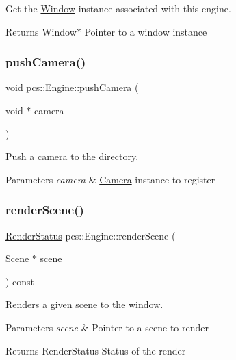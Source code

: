 Get the \hyperlink{classpcs_1_1Window}{Window} instance associated with this engine. 

\begin{DoxyReturn}{Returns}
Window$\ast$ Pointer to a window instance 
\end{DoxyReturn}
\mbox{\label{classpcs_1_1Engine_ab43d2dd55c8519da49f92e7ccef042a8}} 
\subsubsection{\texorpdfstring{push\+Camera()}{pushCamera()}}
{\footnotesize\ttfamily void pcs\+::\+Engine\+::push\+Camera (\begin{DoxyParamCaption}\item[{void $\ast$}]{camera }\end{DoxyParamCaption})\hspace{0.3cm}{\ttfamily [inline]}}



Push a camera to the directory. 


\begin{DoxyParams}{Parameters}
{\em camera} & \hyperlink{classpcs_1_1Camera}{Camera} instance to register \\
\hline
\end{DoxyParams}
\mbox{\label{classpcs_1_1Engine_ad99225f71f2e1dd2b02bd99ad2c59ab3}} 
\subsubsection{\texorpdfstring{render\+Scene()}{renderScene()}}
{\footnotesize\ttfamily \hyperlink{namespacepcs_a979c2971659f1655c7ebe27752b8a9a0}{Render\+Status} pcs\+::\+Engine\+::render\+Scene (\begin{DoxyParamCaption}\item[{\hyperlink{classpcs_1_1Scene}{Scene} $\ast$}]{scene }\end{DoxyParamCaption}) const}



Renders a given scene to the window. 


\begin{DoxyParams}{Parameters}
{\em scene} & Pointer to a scene to render \\
\hline
\end{DoxyParams}
\begin{DoxyReturn}{Returns}
Render\+Status Status of the render 
\end{DoxyReturn}


